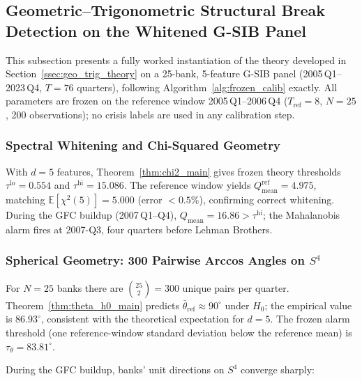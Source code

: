 \documentclass[11pt,a4paper]{article}
\begin{document}
\subsection{Geometric--Trigonometric Structural Break Detection on the
Whitened G-SIB Panel}
\label{ssec:geo_trig_gsib}

This subsection presents a fully worked instantiation of the theory
developed in Section~\ref{ssec:geo_trig_theory} on a 25-bank, 5-feature
G-SIB panel (2005\,Q1--2023\,Q4, $T{=}76$ quarters), following
Algorithm~\ref{alg:frozen_calib} exactly.  All parameters
are frozen on the reference window 2005\,Q1--2006\,Q4
($T_{\mathrm{ref}}{=}8$, $N{=}25$, 200 observations); no crisis
labels are used in any calibration step.

\subsubsection{Spectral Whitening and Chi-Squared Geometry}

With $d=5$ features, Theorem~\ref{thm:chi2_main} gives frozen theory
thresholds $\tau^{\mathrm{lo}}=0.554$ and $\tau^{\mathrm{hi}}=15.086$.
The reference window yields $Q_{\mathrm{mean}}^{\mathrm{ref}} = 4.975$,
matching $\mathbb{E}[\chi^2(5)]=5.000$ (error ${<}0.5\%$), confirming
correct whitening.  During the GFC buildup (2007\,Q1--Q4),
$Q_{\mathrm{mean}} = 16.86 > \tau^{\mathrm{hi}}$; the Mahalanobis alarm
fires at 2007-Q3, four quarters before Lehman Brothers.

\subsubsection{Spherical Geometry: 300 Pairwise Arccos Angles on $S^4$}

For $N=25$ banks there are $\binom{25}{2}=300$ unique pairs per quarter.
Theorem~\ref{thm:theta_h0_main} predicts $\bar\theta_{\mathrm{ref}}
\approx 90^\circ$ under $H_0$; the empirical value is $86.93^\circ$,
consistent with the theoretical expectation for $d=5$.
The frozen alarm threshold (one reference-window standard deviation below
the reference mean) is $\tau_\theta = 83.81^\circ$.

During the GFC buildup, banks' unit directions on $S^4$ converge sharply:
\end{document}
